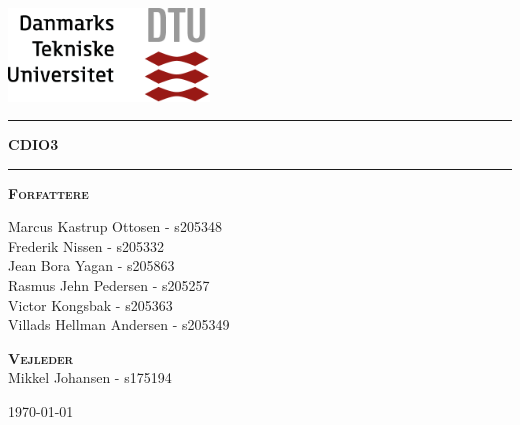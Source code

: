 
\begin{titlepage}
\begin{center}
\vspace{2cm}
\includegraphics[width=0.4\textwidth]{images/dtu.png}~\\[1cm]
\vspace{2cm}

\vspace{2cm}

\hrule
\vspace{.5cm}
{ \huge \bfseries CDIO3} %
\vspace{.5cm}

\hrule
\vspace{1.5cm}

\textsc{\textbf{Forfattere}}\\
\vspace{.5cm}
\centering

Marcus Kastrup Ottosen - s205348\\
Frederik Nissen - s205332\\
Jean Bora Yagan - s205863\\
Rasmus Jehn Pedersen - s205257\\
Victor Kongsbak - s205363\\
Villads Hellman Andersen - s205349\\

\vspace{1cm}

\textsc{\textbf{Vejleder}}\\
\vspace{.5cm}
\centering
Mikkel Johansen - s175194


\vfill

\centering \today %
\end{center}
\end{titlepage}
